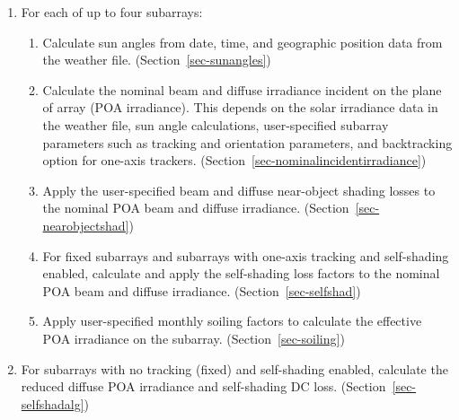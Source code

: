 \documentclass[12pt,letterpaper]{article}
\begin{document}
\begin{enumerate}

\item{For each of up to four subarrays:}

  \begin{enumerate}

  \item{Calculate sun angles from date, time, and geographic position data from the weather file. (Section~\ref{sec-sunangles})} %

  \item{Calculate the nominal beam and diffuse irradiance incident on the plane of array (POA irradiance). This depends on the solar irradiance data in the weather file, sun angle calculations, user-specified subarray parameters such as tracking and orientation parameters, and backtracking option for one-axis trackers. (Section~\ref{sec-nominalincidentirradiance})} %

  \item{Apply the user-specified beam and diffuse near-object shading losses to the nominal POA beam and diffuse irradiance. (Section~\ref{sec-nearobjectshad})} %

  \item{For fixed subarrays and subarrays with one-axis tracking and self-shading enabled, calculate and apply the self-shading loss factors to the nominal POA beam and diffuse irradiance. (Section~\ref{sec-selfshad})} %

  \item{Apply user-specified monthly soiling factors to calculate the effective POA irradiance on the subarray. (Section~\ref{sec-soiling})} %


  \end{enumerate}

\item{For subarrays with no tracking (fixed) and self-shading enabled, calculate the reduced diffuse POA irradiance and self-shading DC loss. (Section~\ref{sec-selfshadalg})} %


\end{enumerate}
\end{document}

